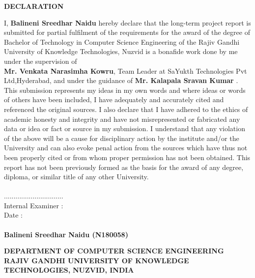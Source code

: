 \documentclass[12pt,a4paper,oneside]{report}
\begin{document}
\newpage
\thispagestyle{empty}
\vspace*{1cm}
\begin{center}{\large \bf DECLARATION}\end{center}
\vspace{1cm}
\hspace{1cm}I, \textbf{Balineni Sreedhar Naidu}  hereby declare that the long-term project report is submitted for partial fulfilment of the requirements for the award of the degree of Bachelor of Technology in Computer Science Engineering of the Rajiv Gandhi University of Knowledge Technologies, Nuzvid is a bonafide work done by me under the supervision of\\ \textbf{Mr. Venkata Narasimha Kowru}, Team Leader at SaYukth Technologies Pvt Ltd,Hyderabad, and under the guidance of \textbf{Mr. Kalapala Sravan Kumar }. This submission represents my ideas in my own words and where ideas or words of others have been included, I have adequately and accurately cited and referenced the original sources. I also declare that I have adhered to the ethics of academic honesty and integrity and have not misrepresented or fabricated any data or idea or fact or source in my submission. I understand that any violation of the above will be a cause for disciplinary action by the institute and/or the University and can also evoke penal action from the sources which have thus not been properly cited or from whom proper permission has not been obtained. This report has not been previously formed as the basis for the award of any degree, diploma, or similar title of any other University.
\\
\vspace{1cm} \\
...............................\\
Internal Examiner :\\
Date : \\
\vspace{1cm} \\
\textbf{Balineni Sreedhar Naidu (N180058)}  



\newpage
{}
\thispagestyle{empty}

\begin{center}
{\large \bf DEPARTMENT OF COMPUTER SCIENCE ENGINEERING}\\
{\large \bf RAJIV GANDHI UNIVERSITY OF KNOWLEDGE TECHNOLOGIES,}
{\large \bf NUZVID, INDIA}\vspace{0.1cm}\end{center}
\end{document}
